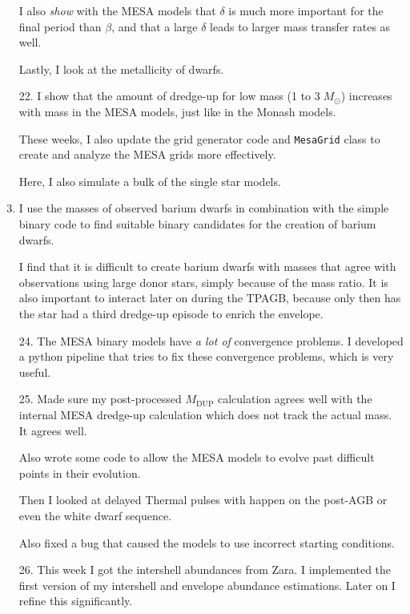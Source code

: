 \documentclass[a4paper,10pt]{article}
\begin{document}
\begin{enumerate}
	      I also \emph{show} with the MESA models that \(\delta \) is much more important for the final
	      period than \(\beta \), and that a large \(\delta \) leads to larger mass transfer rates as well.

	      Lastly, I look at the metallicity of dwarfs.
	\item[\color{keywordscolor}22.] I show that the amount of dredge-up for low mass (1 to 3\(\; M_\odot \)) increases with mass in the MESA models, just like in the Monash \citet{karakas2016} models.

	      These weeks, I also update the grid generator code and \lstinline[style=output, breaklines=true]|MesaGrid| class to create and analyze the MESA grids more effectively.

	      Here, I also simulate a bulk of the single star models.
	\item[\color{keywordscolor}23.] I use the masses of observed barium dwarfs in combination with
	      the simple binary code to find suitable binary candidates for the creation of barium dwarfs.

	      I find that it is difficult to create barium dwarfs with masses that agree with observations
	      using large donor stars, simply because of the mass ratio.
	      It is also important to
	      interact later on during the TPAGB, because only then has the star had a third dredge-up
	      episode to enrich the envelope.
	\item[\color{keywordscolor}24.] The MESA binary models have \emph{a lot of} convergence problems.
	      I developed a python pipeline that tries to fix these convergence problems, which is very useful.
	\item[\color{keywordscolor}25.] Made sure my post-processed \(M_\text{DUP}\) calculation agrees well with the internal MESA dredge-up calculation which does not track the
	      actual mass.
	      It agrees well.

	      Also wrote some code to allow the MESA models to evolve past difficult points in their evolution.

	      Then I looked at delayed Thermal pulses with happen on the post-AGB or even the white dwarf sequence.

	      Also fixed a bug that caused the models to use incorrect starting conditions.
	\item[\color{keywordscolor}26.] This week I got the intershell abundances from Zara.
	      I implemented the first version of my intershell and envelope abundance estimations.
	      Later on I refine this significantly.


\end{enumerate}
\end{document}
